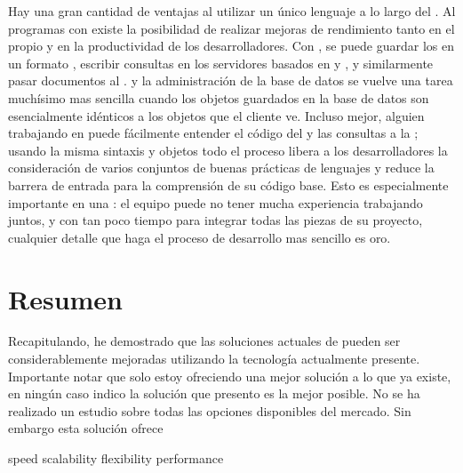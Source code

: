 Hay una gran cantidad de ventajas al utilizar un único lenguaje a lo largo del \stack. Al programas con \javaScriptNAME existe la posibilidad de realizar mejoras de rendimiento tanto en el propio \software y en la productividad de los desarrolladores. Con \mongodbNAME, se puede guardar los \documentsDB en un formato \jsonLikeCPT, escribir consultas \json en los servidores basados en \expressjsNAME y \nodejsNAME, y similarmente pasar documentos \json al \frontEndAS \angularjs. \debuggingPL y la administración de la base de datos se vuelve una tarea muchísimo mas sencilla cuando los objetos guardados en la base de datos son esencialmente idénticos a los objetos que el cliente \javaScriptNAME ve. Incluso mejor, alguien trabajando en \clientSide puede fácilmente entender el código del \serverSide y las consultas a la \dataBase; usando la misma sintaxis y objetos todo el proceso libera a los desarrolladores la consideración de varios conjuntos de buenas prácticas de lenguajes y reduce la barrera de entrada para la comprensión de su código base. Esto es especialmente importante en una \hackathonCPT: el equipo puede no tener mucha experiencia trabajando juntos, y con tan poco tiempo para integrar todas las piezas de su proyecto, cualquier detalle que haga el proceso de desarrollo mas sencillo es oro.


\section{Resumen}
Recapitulando, he demostrado que las soluciones actuales de \ecommerce pueden ser considerablemente mejoradas utilizando la tecnología actualmente presente. 
Importante notar que solo estoy ofreciendo una mejor solución a lo que ya existe, en ningún caso indico la solución que presento es la mejor posible. No se ha realizado un estudio sobre todas las opciones disponibles del mercado. Sin embargo esta solución ofrece

speed
scalability
flexibility
performance
